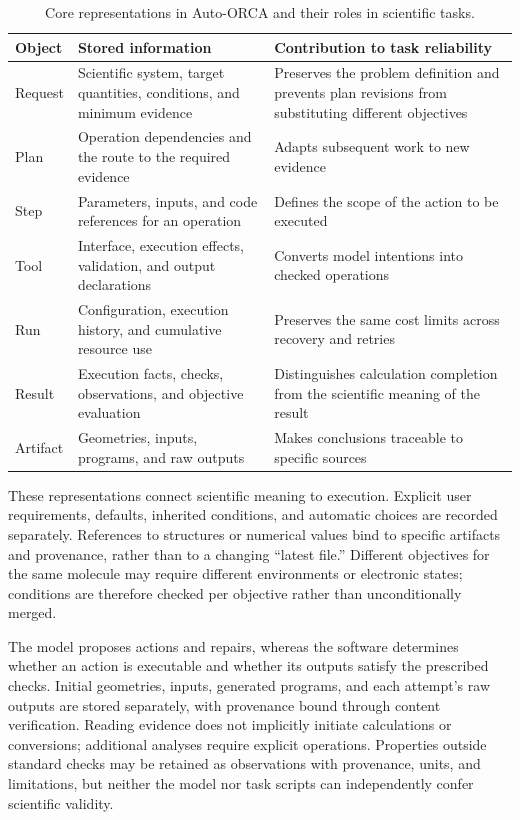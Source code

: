 \documentclass[a4paper,11pt]{article}
\begin{document}
\begin{table}[htbp]
  \centering\small
  \caption{Core representations in Auto-ORCA and their roles in scientific tasks.}
  \label{tab:domain-objects}
  \begin{tabularx}{\linewidth}{>{\raggedright\arraybackslash}p{1.65cm}YY}
    \toprule
    Object & Stored information & Contribution to task reliability\\
    \midrule
    Request & Scientific system, target quantities, conditions, and minimum evidence & Preserves the problem definition and prevents plan revisions from substituting different objectives\\
    Plan & Operation dependencies and the route to the required evidence & Adapts subsequent work to new evidence\\
    Step & Parameters, inputs, and code references for an operation & Defines the scope of the action to be executed\\
    Tool & Interface, execution effects, validation, and output declarations & Converts model intentions into checked operations\\
    Run & Configuration, execution history, and cumulative resource use & Preserves the same cost limits across recovery and retries\\
    Result & Execution facts, checks, observations, and objective evaluation & Distinguishes calculation completion from the scientific meaning of the result\\
    Artifact & Geometries, inputs, programs, and raw outputs & Makes conclusions traceable to specific sources\\
    \bottomrule
  \end{tabularx}
\end{table}

These representations connect scientific meaning to execution.
Explicit user requirements, defaults, inherited conditions, and automatic choices are recorded separately.
References to structures or numerical values bind to specific artifacts and provenance, rather than to a changing ``latest file.''
Different objectives for the same molecule may require different environments or electronic states; conditions are therefore checked per objective rather than unconditionally merged.

The model proposes actions and repairs, whereas the software determines whether an action is executable and whether its outputs satisfy the prescribed checks.
Initial geometries, inputs, generated programs, and each attempt's raw outputs are stored separately, with provenance bound through content verification.
Reading evidence does not implicitly initiate calculations or conversions; additional analyses require explicit operations.
Properties outside standard checks may be retained as observations with provenance, units, and limitations, but neither the model nor task scripts can independently confer scientific validity.
\end{document}
